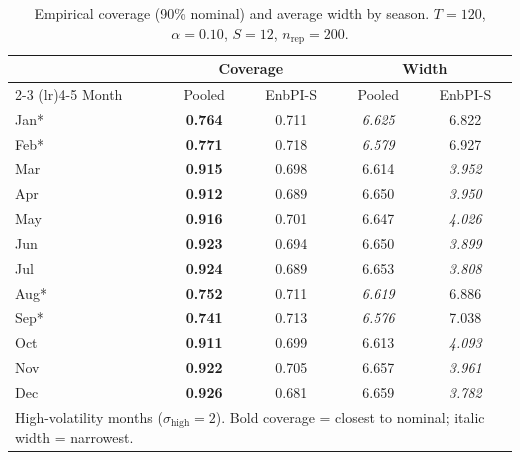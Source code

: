 \begin{table}[ht]
\centering
\caption{Empirical coverage (90\% nominal) and average width by season.
$T=120$, $\alpha=0.10$, $S=12$, $n_{\mathrm{rep}}=200$.}
\label{tab:e1_coverage_T120}
\begin{tabular}{l cc cc}
\toprule
 & \multicolumn{2}{c}{Coverage} & \multicolumn{2}{c}{Width} \\
\cmidrule(lr){2-3} \cmidrule(lr){4-5}
Month & Pooled & EnbPI-S & Pooled & EnbPI-S \\
\midrule
Jan* & \textbf{0.764} & 0.711 & \textit{6.625} & 6.822 \\
Feb* & \textbf{0.771} & 0.718 & \textit{6.579} & 6.927 \\
Mar & \textbf{0.915} & 0.698 & 6.614 & \textit{3.952} \\
Apr & \textbf{0.912} & 0.689 & 6.650 & \textit{3.950} \\
May & \textbf{0.916} & 0.701 & 6.647 & \textit{4.026} \\
Jun & \textbf{0.923} & 0.694 & 6.650 & \textit{3.899} \\
Jul & \textbf{0.924} & 0.689 & 6.653 & \textit{3.808} \\
Aug* & \textbf{0.752} & 0.711 & \textit{6.619} & 6.886 \\
Sep* & \textbf{0.741} & 0.713 & \textit{6.576} & 7.038 \\
Oct & \textbf{0.911} & 0.699 & 6.613 & \textit{4.093} \\
Nov & \textbf{0.922} & 0.705 & 6.657 & \textit{3.961} \\
Dec & \textbf{0.926} & 0.681 & 6.659 & \textit{3.782} \\
\bottomrule
\multicolumn{5}{l}{\footnotesize * High-volatility months ($\sigma_{\mathrm{high}}=2$).  Bold coverage = closest to nominal; italic width = narrowest.}\\
\end{tabular}
\end{table}
